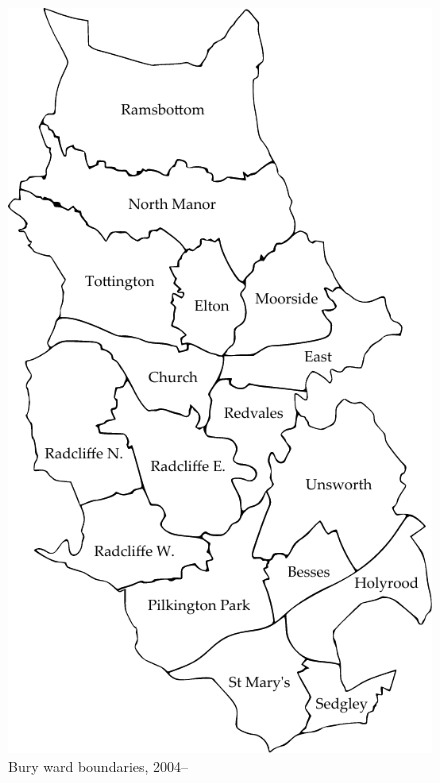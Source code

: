 \begin{figure}
\centering
\includegraphics[height=0.9\textheight]{source/bury04}
\caption{Bury ward boundaries, 2004--}
\end{figure}

